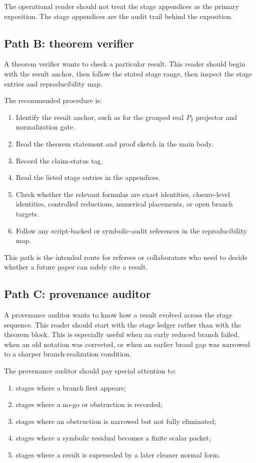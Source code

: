 The operational reader should not treat the stage appendices as the primary exposition.  The stage appendices are the audit trail behind the exposition.

\subsection{Path B: theorem verifier}
\label{subsec:path-theorem-verifier}

A theorem verifier wants to check a particular result.  This reader should begin with the result anchor, then follow the stated stage range, then inspect the stage entries and reproducibility map.

The recommended procedure is:
\begin{enumerate}[leftmargin=2.2em]
  \item Identify the result anchor, such as  for the grouped real \(P_2\) projector and normalization gate.
  \item Read the theorem statement and proof sketch in the main body.
  \item Record the claim-status tag.
  \item Read the listed stage entries in the appendices.
  \item Check whether the relevant formulas are exact identities, closure-level identities, controlled reductions, numerical placements, or open branch targets.
  \item Follow any script-backed or symbolic-audit references in the reproducibility map.
\end{enumerate}

This path is the intended route for referees or collaborators who need to decide whether a future paper can safely cite a result.

\subsection{Path C: provenance auditor}
\label{subsec:path-provenance-auditor}

A provenance auditor wants to know how a result evolved across the stage sequence.  This reader should start with the stage ledger rather than with the theorem block.  This is especially useful when an early reduced branch failed, when an old notation was corrected, or when an earlier broad gap was narrowed to a sharper branch-realization condition.

The provenance auditor should pay special attention to:
\begin{enumerate}[leftmargin=2.2em]
  \item stages where a branch first appears;
  \item stages where a no-go or obstruction is recorded;
  \item stages where an obstruction is narrowed but not fully eliminated;
  \item stages where a symbolic residual becomes a finite scalar packet;
  \item stages where a result is superseded by a later cleaner normal form.
\end{enumerate}

